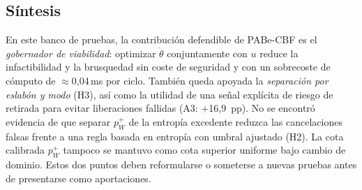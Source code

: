 \subsection{Síntesis}
\label{sec:sim:summary}
En este banco de pruebas, la contribución defendible de PABe-CBF es el
\emph{gobernador de viabilidad}: optimizar $\dot\theta$ conjuntamente con $u$ reduce la
infactibilidad y la brusquedad sin coste de seguridad y con un sobrecoste de cómputo de
$\approx$0{,}04\,ms por ciclo. También queda apoyada la \emph{separación por eslabón y modo} (H3), así como la utilidad de una
señal explícita de riesgo de retirada para evitar liberaciones fallidas (A3: +16{,}9~pp). No se
encontró evidencia de que separar $p_W^+$ de la entropía excedente reduzca las cancelaciones falsas frente a
una regla basada en entropía con umbral ajustado (H2). La cota calibrada $p_W^+$ tampoco se mantuvo como cota superior uniforme bajo
cambio de dominio. Estos dos puntos deben reformularse o someterse a nuevas pruebas antes de presentarse como
aportaciones.
